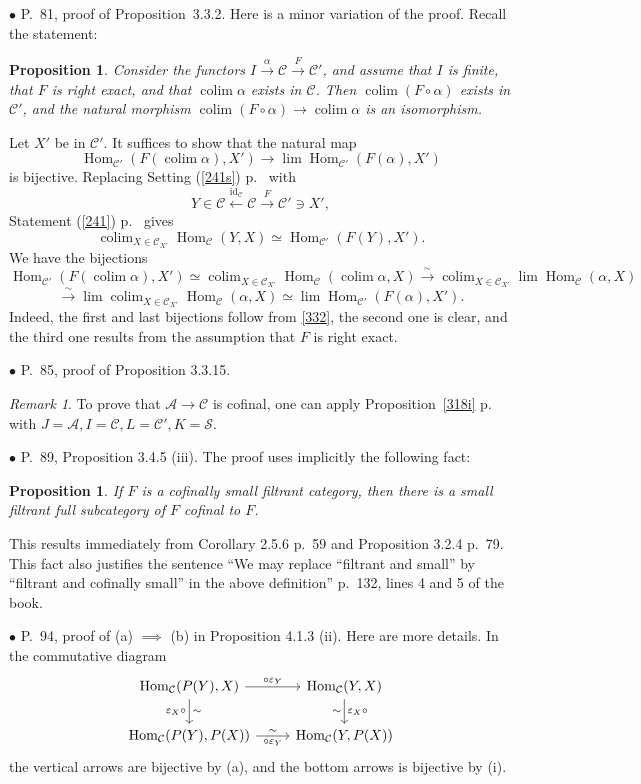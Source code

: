 \documentclass[12pt]{article}
\newtheorem{prop}[thm]{Proposition}
\theoremstyle{remark}%
\newtheorem{rk}[thm]{Remark}
\newcommand{\bu}{\bullet}
\newcommand{\n}{\noindent}
\newcommand{\cc}{\mathcal}
\newcommand{\A}{\mathcal A}
\newcommand{\C}{\mathcal C}
\newcommand{\e}{\varepsilon}
\newcommand{\xr}{\xrightarrow}
\newcommand{\be}{\begin{equation}}
\newcommand{\ee}{\end{equation}}
\newcommand{\pr}{Proposition}
\DeclareMathOperator*{\co}{colim}
\DeclareMathOperator{\id}{id}
\DeclareMathOperator{\h}{Hom}
\begin{document}
\n$\bu$ P.~81, proof of \pr\ 3.3.2. Here is a minor variation of the proof. Recall the statement: 
% 
\begin{prop} 
% 
Consider the functors $I\xrightarrow\alpha\C\xrightarrow F\C'$, and assume that $I$ is finite, that $F$ is right exact, and that $\co\alpha$ exists in $\C$. Then $\co(F\circ\alpha)$ exists in $\C'$, and the natural morphism $\co(F\circ\alpha)\to\co\alpha$ is an isomorphism. 
%
\end{prop} 
% 
\n{\em Proof.} Let $X'$ be in $\C'$. It suffices to show that the natural map  
$$
\h_{\C'}(F(\co\alpha),X')\to\lim\h_{\C'}(F(\alpha),X')
$$ 
% 
is bijective. Replacing Setting (\ref{241s}) p.~\pageref{241s} with 
$$
Y\in\C\xleftarrow{\id_\C}\C\xrightarrow{F}\C'\ni X', 
$$ 
Statement (\ref{241}) p.~\pageref{241} gives 
% 
\be\label{332} 
\co_{X\in\C_{X'}}\h_\C(Y,X)\simeq\h_{\C'}(F(Y),X').  
\ee 
% 
We have the bijections 
$$ 
\h_{\C'}(F(\co\alpha),X')\simeq\co_{X\in\C_{X'}}\h_\C(\co\alpha,X)\xr\sim\co_{X\in\C_{X'}}\lim\h_\C(\alpha,X) 
$$ 
$$
\xr\sim\lim\co_{X\in\C_{X'}}\h_\C(\alpha,X)\simeq\lim\h_{\C'}(F(\alpha),X'). 
$$ 
Indeed, the first and last bijections follow from \eqref{332}, the second one is clear, and the third one results from the assumption that $F$ is right exact. 


\n$\bu$ P.~85, proof of Proposition 3.3.15. 
%
\begin{rk}\label{3315}  
% 
To prove that $\A\to\C$ is cofinal, one can apply \pr\ \ref{318i} p.~\pageref{318i} with $J=\A,I=\C,L=\C',K=\cc S$. 
%
\end{rk} 


\n$\bu$ P.~89, Proposition 3.4.5 (iii). The proof uses implicitly the following fact: 

\begin{prop}\label{355} 
If $F$ is a cofinally small filtrant category, then there is a small {\em filtrant} full subcategory of $F$ cofinal to $F$. 
\end{prop}

This results immediately from Corollary 2.5.6 p.~59 and Proposition 3.2.4 p.~79. This fact also justifies the sentence ``We may replace ``filtrant and small'' by ``filtrant and cofinally small'' in the above definition'' p.~132, lines 4 and 5 of the book.%


\n$\bu$ P.~94, proof of (a) $\implies$ (b) in Proposition 4.1.3 (ii). Here are more details. In the commutative diagram 
$$
\begin{tikzcd}
\h_\C(P(Y),X)\ar{d}{\sim}[swap]{\e_X\circ}\ar{r}{\circ\e_Y}&\h_\C(Y,X)\ar{d}{\e_X\circ}[swap]{\sim}\\ 
\h_\C(P(Y),P(X))\ar{r}[swap]{\circ\e_Y}{\sim}&\h_\C(Y,P(X))
\end{tikzcd}
$$ 
the vertical arrows are bijective by (a), and the bottom arrows is bijective by (i). 
\end{document}
